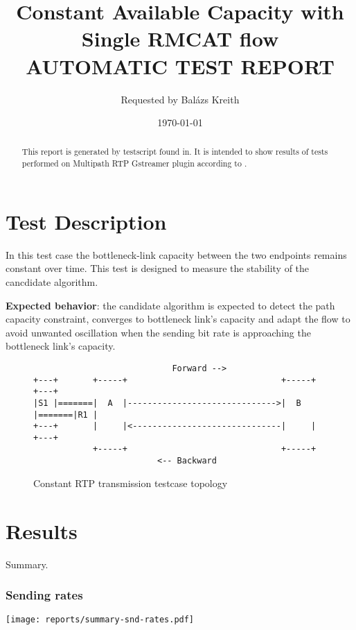 \documentclass[a4paper]{article}
\title{
Constant Available Capacity with Single RMCAT flow
\\[1cm]
\large \textbf{AUTOMATIC TEST REPORT}
\\[1cm]
}
\author{
Requested by 
Balázs Kreith
}
\date{\today}
\begin{document}
\maketitle


\begin{abstract}
This report is generated by testscript found in\cite{mprtp_gstreamer_github}. It is intended to show results of tests performed on Multipath RTP Gstreamer plugin according to \cite{rmcat_test_draft}.
\end{abstract}

\section{Test Description}


\label{sec:introduction}
 
In this test case the bottleneck-link capacity between the two
endpoints remains constant over time. This test is designed to measure 
the stability of the cancdidate algorithm.

\textbf{Expected behavior}: the candidate algorithm is expected to detect the
path capacity constraint, converges to bottleneck link's capacity and
adapt the flow to avoid unwanted oscillation when the sending bit
rate is approaching the bottleneck link's capacity.  

\begin{figure}
\begin{verbatim}
                            Forward -->
+---+       +-----+                               +-----+       +---+
|S1 |=======|  A  |------------------------------>|  B  |=======|R1 |
+---+       |     |<------------------------------|     |       +---+
            +-----+                               +-----+
                         <-- Backward
\end{verbatim}
\caption{Constant RTP transmission testcase topology}
\label{fig:ascii-box}
\end{figure}



\section{Results}
\label{sec:results}

Summary.

\subsubsection{Sending rates}
\texttt{[image: reports/summary-snd-rates.pdf]}
\end{document}
